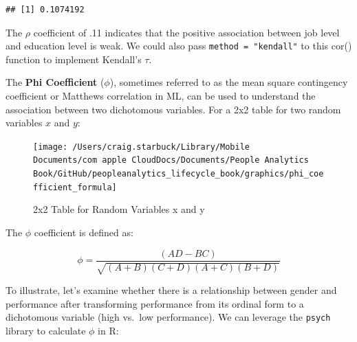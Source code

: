 \documentclass[]{book}
\newenvironment{Shaded}{\begin{snugshade}}{\end{snugshade}}
\newcommand{\CommentTok}[1]{\textcolor[rgb]{0.56,0.35,0.01}{\textit{#1}}}
\newcommand{\DecValTok}[1]{\textcolor[rgb]{0.00,0.00,0.81}{#1}}
\newcommand{\KeywordTok}[1]{\textcolor[rgb]{0.13,0.29,0.53}{\textbf{#1}}}
\newcommand{\NormalTok}[1]{#1}
\newcommand{\OperatorTok}[1]{\textcolor[rgb]{0.81,0.36,0.00}{\textbf{#1}}}
\newcommand{\StringTok}[1]{\textcolor[rgb]{0.31,0.60,0.02}{#1}}
\begin{document}
\begin{verbatim}
## [1] 0.1074192
\end{verbatim}

The \(\rho\) coefficient of .11 indicates that the positive association between job level and education level is weak. We could also pass \texttt{method\ =\ "kendall"} to this cor() function to implement Kendall's \(\tau\).

The \textbf{Phi Coefficient} (\(\phi\)), sometimes referred to as the mean square contingency coefficient or Matthews correlation in ML, can be used to understand the association between two dichotomous variables. For a 2x2 table for two random variables \(x\) and \(y\):

\begin{figure}

{\centering \texttt{[image: /Users/craig.starbuck/Library/Mobile Documents/com~apple~CloudDocs/Documents/People Analytics Book/GitHub/peopleanalytics\_lifecycle\_book/graphics/phi\_coefficient\_formula]} 

}

\caption{2x2 Table for Random Variables x and y}\label{fig:phi-tbl}
\end{figure}

The \(\phi\) coefficient is defined as:

\[ \phi = {\frac {(AD-BC)}{\sqrt{(A+B)(C+D)(A+C)(B+D)}}} \]

To illustrate, let's examine whether there is a relationship between gender and performance after transforming performance from its ordinal form to a dichotomous variable (high vs.~low performance). We can leverage the \texttt{psych} library to calculate \(\phi\) in R:

\begin{Shaded}
\end{Shaded}
\end{document}
